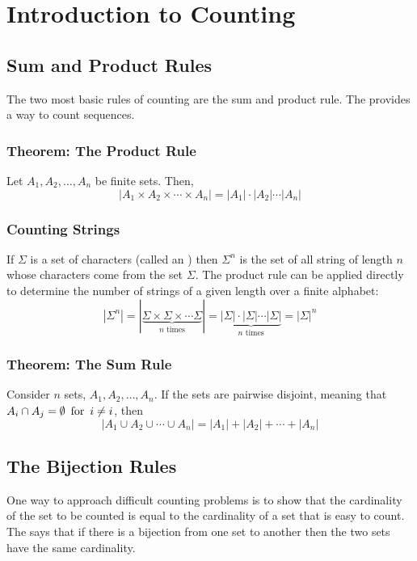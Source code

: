 \section{Introduction to Counting}
\subsection{Sum and Product Rules}

The two most basic rules of counting are the sum and product rule. The  provides a way to count sequences.

\subsubsection*{Theorem: The Product Rule}
Let $A_1,A_2,\ldots,A_n$ be finite sets. Then,
\[
  | A_1 \times A_2 \times \cdots \times A_n | = |A_1| \cdot |A_2| \cdots |A_n|
\]

\subsubsection*{Counting Strings}
If $\Sigma$ is a set of characters (called an ) then $\Sigma^n$ is the set of all string of length $n$ whose characters come from the set $\Sigma$. The product rule can be applied directly to determine the number of strings of a given length over a finite alphabet:
\[
  |\Sigma^n| = |\underbrace{\Sigma \times \Sigma \times \cdots \Sigma}_{\text{$n$ times}}| = \underbrace{|\Sigma| \cdot |\Sigma| \cdots |\Sigma|}_{\text{$n$ times}} = |\Sigma|^n
\]

\subsubsection*{Theorem: The Sum Rule}
Consider $n$ sets, $A_1, A_2, \ldots, A_n$. If the sets are pairwise disjoint, meaning that $A_i \cap A_j = \emptyset \operatorname{~\text{for}~} i \neq i$, then
\[
  |A_1 \cup A_2 \cup \cdots \cup A_n| = |A_1| + |A_2| + \cdots + |A_n|
\]

\subsection{The Bijection Rules}
One way to approach difficult counting problems is to show that the cardinality of the set to be counted is equal to the cardinality of a set that is easy to count. The  says that if there is a bijection from one set to another then the two sets have the same cardinality.

